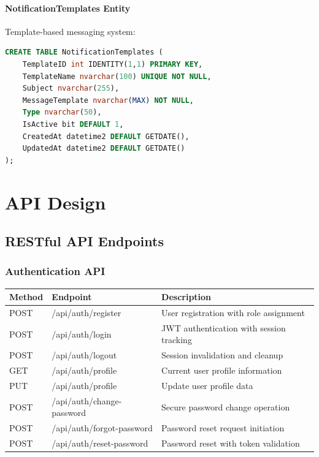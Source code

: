 \documentclass[12pt,a4paper]{article}
\begin{document}
\paragraph{NotificationTemplates Entity}
Template-based messaging system:

\begin{lstlisting}[language=SQL]
CREATE TABLE NotificationTemplates (
    TemplateID int IDENTITY(1,1) PRIMARY KEY,
    TemplateName nvarchar(100) UNIQUE NOT NULL,
    Subject nvarchar(255),
    MessageTemplate nvarchar(MAX) NOT NULL,
    Type nvarchar(50),
    IsActive bit DEFAULT 1,
    CreatedAt datetime2 DEFAULT GETDATE(),
    UpdatedAt datetime2 DEFAULT GETDATE()
);
\end{lstlisting}

\section{API Design}

\subsection{RESTful API Endpoints}

\subsubsection{Authentication API}

\begin{longtable}{|p{1.5cm}|p{4cm}|p{6.5cm}|}
\hline
\textbf{Method} & \textbf{Endpoint} & \textbf{Description} \\
\hline
POST & /api/auth/register & User registration with role assignment \\
\hline
POST & /api/auth/login & JWT authentication with session tracking \\
\hline
POST & /api/auth/logout & Session invalidation and cleanup \\
\hline
GET & /api/auth/profile & Current user profile information \\
\hline
PUT & /api/auth/profile & Update user profile data \\
\hline
POST & /api/auth/change-password & Secure password change operation \\
\hline
POST & /api/auth/forgot-password & Password reset request initiation \\
\hline
POST & /api/auth/reset-password & Password reset with token validation \\
\hline
\end{longtable}
\end{document}
